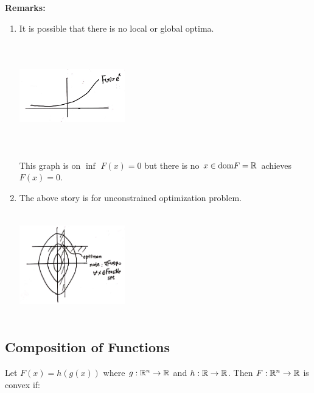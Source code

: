 \textbf{Remarks: }
\begin{enumerate}
	\item It is possible that there is no local or global optima.
	
	\begin{marginfigure}
	\centering
	\includegraphics[width=1.8in,height=1.8in]{figures/ch08/figure1111_2.png}
	\end{marginfigure}
	
	This graph is on $\inf\,\, F(x) = 0$ but there is no $x\in \text{dom}F = \mathbb{R}$ achieves $F(x) = 0$.
	
	\item The above story is for unconstrained optimization problem.
	
	\begin{marginfigure}
	\centering
	\includegraphics[width=1.8in,height=1.8in]{figures/ch08/figure1111_3.png}
	\end{marginfigure}
	
\end{enumerate}






\vspace{0.5cm}
\subsection{Composition of Functions}

Let $F(x) = h(g(x))$ where $g: \mathbb{R}^n \rightarrow \mathbb{R}$ and $h: \mathbb{R}\rightarrow \mathbb{R}$. Then $F: \mathbb{R}^n\rightarrow \mathbb{R}$ is convex if:



